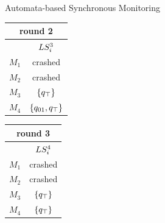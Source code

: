 \begin{frame}{Automata-based Synchronous Monitoring}
\begin{example}
\begin{center}
\begin{tabular}{| c |c|}
\multicolumn{2}{c}{round 2} \\
\hline
&$LS_i^3$\\
\hline
$M_1$ & crashed\\
$M_2$ & crashed\\
$M_3$ & $\{q_\top\}$ \\
$M_4$ & $\{q_{01}, q_\top\}$ \\
\hline
\end{tabular} 
\quad
\begin{tabular}{| c |c|}
\multicolumn{2}{c}{round 3} \\
\hline
&$LS_i^4$\\
\hline
$M_1$ & crashed\\
$M_2$ & crashed\\
$M_3$ & $\{q_\top\}$ \\
$M_4$ & $\{q_\top\}$ \\
\hline
\end{tabular} 
\end{center}




\end{example}

\end{frame}




